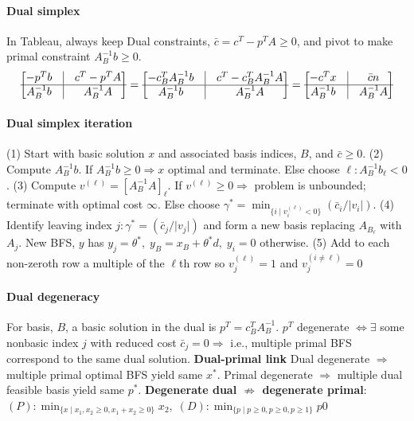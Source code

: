 \documentclass{article}
\newcommand{\abs}[1]{\lvert#1\rvert}
\begin{document}
\paragraph{Dual simplex} In Tableau, always keep Dual constraints, $\bar c = c^T - p^TA \geq 0$, and pivot to make primal constraint $A_B^{-1}b \geq 0$.
\begin{align*}
    \begin{bmatrix}
        -p^Tb & \vline& c^T - p^TA\\
        \hline
        A_B^{-1}b & \vline & A_B^{-1}A
    \end{bmatrix} = 
    \begin{bmatrix}
        -c_B^TA_B^{-1}b & \vline& c^T - c_B^TA_B^{-1}A\\
        \hline
        A_B^{-1}b & \vline & A_B^{-1}A
    \end{bmatrix} = \begin{bmatrix}
        -c^Tx & \vline& \bar cn\\
        \hline
        A_B^{-1}b & \vline & A_B^{-1}A\\
    \end{bmatrix}
\end{align*}
\paragraph{Dual simplex iteration} (1) Start with basic solution $x$ and associated basis indices, $B$, and $\bar c \geq 0$. (2) Compute $A_B^{-1}b$. If $A_B^{-1}b \geq 0 \Rightarrow x$ optimal and terminate. Else choose $\ell: A_B^{-1}b_\ell < 0$. (3) Compute $v^{(\ell)} = [A_B^{-1}A]_\ell$. If $v^{(\ell)} \geq 0 \Rightarrow$ problem is unbounded; terminate with optimal cost $\infty$. Else choose $\gamma^* = \min_{\{i\mid v^{(\ell)}_i < 0\}}(\bar c_i / \abs{v_i})$. (4) Identify leaving index $j: \gamma^* = (\bar c_j / \abs{v_j})$ and form a new basis replacing $A_{B_\ell}$ with $A_j$. New BFS, $y$ has $y_j = \theta^*,\; y_B = x_B + \theta^*d,\; y_i = 0$ otherwise. (5) Add to each non-zeroth row a multiple of the $\ell$th row so $v^{(\ell)}_j = 1$ and $v^{(i\neq \ell)}_j = 0$ 


\paragraph{Dual degeneracy} For basis, $B$, a basic solution in the dual is $p^T = c_B^TA_B^{-1}$. $p^T$ degenerate $\iff \exists$ some nonbasic index $j$ with reduced cost $\bar c_j = 0 \Longrightarrow$ i.e., multiple  primal BFS correspond to the same dual solution. 
\textbf{Dual-primal link} Dual degenerate $\Longrightarrow$ multiple primal optimal BFS yield same $x^*$. Primal degenerate $\Longrightarrow$ multiple dual feasible basis yield same $p^*$. 
\textbf{Degenerate dual $\not \Rightarrow$ degenerate primal}: $(P):\min_{\{x\mid x_1, x_2 \geq 0, x_1 + x_2 \geq 0\}}x_2,\; (D): \min_{\{p\mid p\geq 0, p\geq 0, p\geq 1\}}p0$
\end{document}
